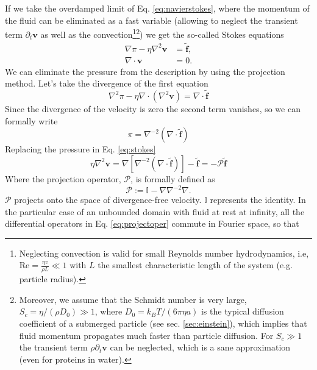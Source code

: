 \documentclass[ twoside,openright,titlepage,numbers=noenddot,%
headinclude,footinclude,cleardoublepage=empty,abstract=on,
BCOR=5mm,paper=b5,fontsize=11pt, dvipsnames
]{scrreprt}
\renewcommand{\vec}[1]{\bm{#1}}
\newcommand{\oper}[1]{\mathcal{#1}}
\newcommand{\kT}{k_B T}
\newcommand{\fvel}{v}
\begin{document}
If we take the overdamped limit of Eq. \eqref{eq:navierstokes}, where the momentum of the fluid can be eliminated as a fast variable (allowing to neglect the transient term $\partial_t \vec{\fvel}$ as well as the convection\footnote{Neglecting convection is valid for small Reynolds number hydrodynamics, i.e, $\text{Re} = \frac{\eta v}{\rho L} \ll 1$ with $L$ the smallest characteristic length of the system (e.g. particle radius).}\footnote{Moreover, we assume that the Schmidt number is very large, $S_c = \eta/(\rho D_0) \gg 1$, where $D_0 = \kT/(6\pi\eta a)$ is the typical diffusion coefficient of a submerged particle (see sec. \ref{sec:einstein}), which implies that fluid momentum propagates much faster than particle diffusion. For $S_c\gg 1$ the transient term $\rho\partial_t\vec{v}$ can be neglected, which is a sane approximation (even for proteins in water).}) we get the so-called Stokes equations
\begin{equation}
  \label{eq:stokes}
  \begin{aligned}
    \nabla \pi - \eta \nabla^2\vec{\fvel} &=  \tilde{\vec{f}},\\
    \nabla\cdot\vec{\fvel} &= 0.
  \end{aligned}
\end{equation}
We can eliminate the pressure from the description by using the projection method. Let's take the divergence of the first equation
\begin{equation}
  \nabla^2 \pi - \eta \nabla\cdot(\nabla^2\vec{\fvel}) =  \nabla\cdot\tilde{\vec{f}}
\end{equation}
Since the divergence of the velocity is zero the second term vanishes, so we can formally write
\begin{equation}
  \label{eq:stokespressure}
  \pi = \nabla^{-2}(\nabla\cdot\tilde{\vec{f}})
\end{equation}
Replacing the pressure in Eq. \eqref{eq:stokes}
\begin{equation}
  \eta\nabla^2\vec{\fvel} = \nabla\left[\nabla^{-2}(\nabla\cdot\tilde{\vec{f}})\right] - \tilde{\vec{f}} = -\oper{P} \tilde{\vec{f}}
\end{equation}
Where the projection operator, $\oper{P}$, is formally defined as
\begin{equation}
  \label{eq:projectoper}
\oper{P}  :=  \mathbb{I} - \nabla\nabla^{-2}\nabla.
\end{equation}
$\oper{P}$ projects onto the space of divergence-free velocity. $\mathbb{I}$ represents the identity.
In the particular case of an unbounded domain with fluid at rest at infinity, all the differential operators in Eq. \eqref{eq:projectoper} commute in Fourier space, so that
\end{document}
